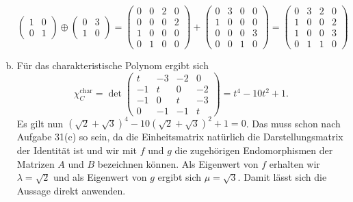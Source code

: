 \documentclass{article}
\theoremstyle{definition}
\begin{document}
\begin{enumerate}[(a)]
\[\begin{pmatrix}
                    1 & 0\\0 & 1
                \end{pmatrix} \oplus \begin{pmatrix}
                    0 & 3 \\ 1 & 0
                \end{pmatrix} =  \begin{pmatrix}
                    0 & 0 & 2 & 0\\
                    0 & 0 & 0 & 2\\
                    1 & 0 & 0 & 0\\
                    0 & 1 & 0 & 0
                \end{pmatrix} + \begin{pmatrix}
                    0 & 3 & 0 & 0\\
                    1 & 0 & 0 & 0\\
                    0 & 0 & 0 & 3\\
                    0 & 0 & 1 & 0
                \end{pmatrix}
                = \begin{pmatrix}
                    0 & 3 & 2 & 0\\
                    1 & 0 & 0 & 2\\
                    1 & 0 & 0 & 3\\
                    0 & 1 & 1 & 0
                \end{pmatrix}
          \]
          \item Für das charakteristische Polynom ergibt sich \[
                \chi^{\operatorname{char}}_C = \det \begin{pmatrix}
                    t & -3 & -2 & 0\\
                    -1 & t & 0 & -2\\
                    -1 & 0 & t & -3\\
                    0 & -1 & -1 & t
                \end{pmatrix} = t^4 - 10t^2 + 1.
          \]
            Es gilt nun $(\sqrt{2} + \sqrt{3})^4 - 10(\sqrt{2} + \sqrt{3})^2 + 1 = 0$. Das muss schon nach Aufgabe 31(c) so sein, da die Einheitsmatrix natürlich die Darstellungsmatrix der Identität ist und wir mit $f$ und $g$ die zugehörigen Endomorphismen der Matrizen $A$ und $B$ bezeichnen können. Als Eigenwert von $f$ erhalten wir $\lambda = \sqrt{2}$ und als Eigenwert von $g$ ergibt sich $\mu = \sqrt{3}$. Damit lässt sich die Aussage direkt anwenden.
\end{enumerate}
\end{document}
